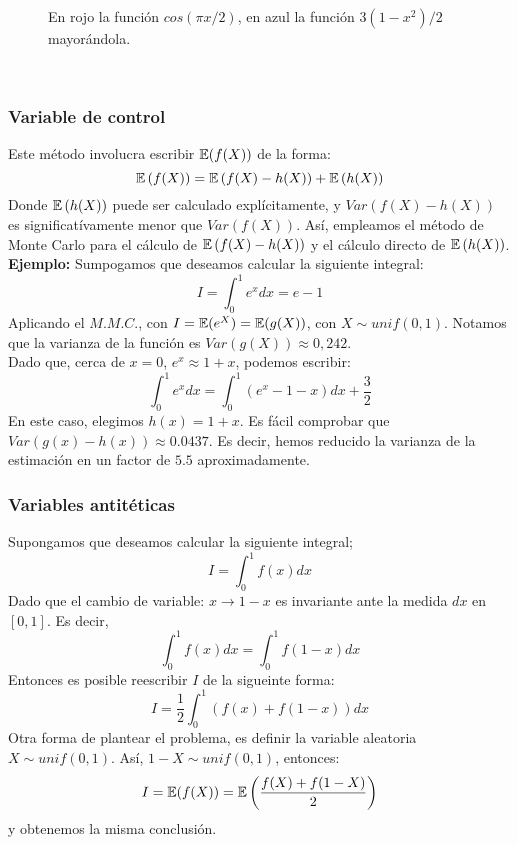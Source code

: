 \begin{figure}[h!]
    \centering
    \caption{En rojo la función $cos(\pi x/2)$, en azul la función $3(1-x^2)/2$ mayorándola.}
\end{figure}\\

\subsubsection{Variable de control}
Este método involucra escribir $\mathbb E(f(X))$ de la forma:
\[\mathbb E\left(f(X)\right) = \mathbb E\left(f(X)-h(X)\right) + \mathbb E\left(h(X)\right)\]
Donde $\mathbb E\left(h(X)\right)$ puede ser calculado explícitamente, y $Var\left(f(X)-h(X)\right)$ es significatívamente menor que $Var\left(f(X)\right)$. Así, empleamos el método de Monte Carlo para el cálculo de $\mathbb E\left(f(X)-h(X)\right)$ y el cálculo directo de $\mathbb E\left(h(X)\right)$.\\ \newline
\textbf{Ejemplo: }Sumpogamos que deseamos calcular la siguiente integral:
\[I = \int_{0}^1 e^x dx = e-1\]
Aplicando el $M.M.C.$, con $I=\mathbb E(e^X) = \mathbb E(g(X))$, con $X\sim unif(0,1)$. Notamos que la varianza de la función es $Var(g(X)) \approx 0,242$.\\
Dado que, cerca de $x=0$, $e^x \approx 1+x$, podemos escribir:
\[\int_{0}^1 e^x dx = \int_{0}^1 (e^x -1-x)dx + \frac{3}{2}\]
En este caso, elegimos $h(x)=1+x$. Es fácil comprobar que $Var\left(g(x)-h(x)\right) \approx 0.0437$. Es decir, hemos reducido la varianza de la estimación en un factor de $5.5$ aproximadamente.

\subsubsection{Variables antitéticas}
Supongamos que deseamos calcular la siguiente integral;
\[I =   \int_{0}^1 f(x)dx\]
Dado que el cambio de variable: $x\rightarrow 1-x$ es invariante ante la medida $dx$ en $[0,1]$. Es decir,
\[\int_{0}^1f(x)dx = \int_{0}^1f(1-x)dx\]
Entonces es posible reescribir $I$ de la sigueinte forma:
\[I = \frac{1}{2}\int_{0}^1 (f(x) + f(1-x))dx\]
Otra forma de plantear el problema, es definir la variable aleatoria $X\sim unif(0,1)$. Así, $1-X \sim unif(0,1)$, entonces:
\[I = \mathbb E(f(X)) = \mathbb E\left(\frac{f(X)+f(1-X)}{2}\right)\]
y obtenemos la misma conclusión.\\ \newline

